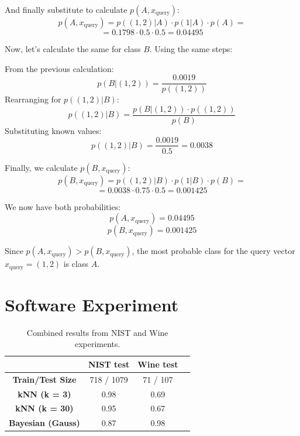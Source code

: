 \documentclass{article}
\begin{document}
And finally substitute to calculate \( p(A, x_\text{query}) \):
\[
p(A, x_\text{query}) = p((1,2) | A) \cdot p(1 | A) \cdot p(A) = 
\]
\[
= 0.1798 \cdot 0.5 \cdot 0.5 = 0.04495
\]

\bigskip

Now, let’s calculate the same for class \( B \). Using the same steps:

From the previous calculation:
\[
p(B | (1,2)) = \frac{0.0019}{p((1,2))}
\]
Rearranging for \( p((1,2) | B) \):
\[
p((1,2) | B) = \frac{p(B | (1,2)) \cdot p((1,2))}{p(B)}
\]
Substituting known values:
\[
p((1,2) | B) = \frac{0.0019}{0.5} = 0.0038
\]

Finally, we calculate \( p(B, x_\text{query}) \):
\[
p(B, x_\text{query}) = p((1,2) | B) \cdot p(1 | B) \cdot p(B) =
\]
\[
= 0.0038 \cdot 0.75 \cdot 0.5 = 0.001425
\]

\bigskip

We now have both probabilities:
\[
p(A, x_\text{query}) = 0.04495
\]
\[
p(B, x_\text{query}) = 0.001425
\]

Since \( p(A, x_\text{query}) > p(B, x_\text{query}) \), the most probable class for the query vector \( x_\text{query} = (1,2) \) is class \( A \).

\newpage

\section{Software Experiment} 
\begin{table}[h!]
\centering
\begin{tabular}{|c|c|c|c|}
\hline
\textbf{}          & \textbf{NIST test} & \textbf{Wine test} \\ \hline
\textbf{Train/Test Size} & 718 / 1079 & 71 / 107                \\ \hline
\textbf{kNN (k = 3)}     & 0.98                     & 0.69                     \\ \hline
\textbf{kNN (k = 30)}    & 0.95                     & 0.67                     \\ \hline
\textbf{Bayesian (Gauss)}& 0.87                     & 0.98                     \\ \hline
\end{tabular}
\caption{Combined results from NIST and Wine experiments.}
\end{table}
\end{document}
